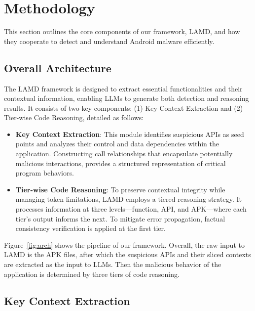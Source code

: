 \section{Methodology}
This section outlines the core components of our framework, LAMD, and how they cooperate to detect and understand Android malware efficiently.

\subsection{Overall Architecture}
The LAMD framework is designed to extract essential functionalities and their contextual information, enabling LLMs to generate both detection and reasoning results. It consists of two key components: (1) Key Context Extraction and (2) Tier-wise Code Reasoning, detailed as follows:
\begin{itemize}
    \item \textbf{Key Context Extraction}: This module identifies suspicious APIs as seed points and analyzes their control and data dependencies within the application. Constructing call relationships that encapsulate potentially malicious interactions, provides a structured representation of critical program behaviors.
    \item \textbf{Tier-wise Code Reasoning}: To preserve contextual integrity while managing token limitations, LAMD employs a tiered reasoning strategy. It processes information at three levels—function, API, and APK—where each tier’s output informs the next. To mitigate error propagation, factual consistency verification is applied at the first tier.
\end{itemize}
Figure~\ref{fig:arch} shows the pipeline of our framework. Overall, the raw input to LAMD is the APK files, after which the suspicious APIs and their sliced contexts are extracted as the input to LLMs. Then the malicious behavior of the application is determined by three tiers of code reasoning.

\subsection{Key Context Extraction}
